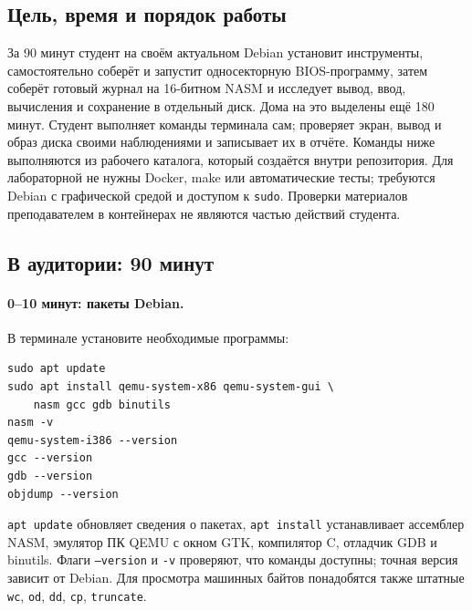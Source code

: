 \label{seminar04}
\begingroup
\setlength{\emergencystretch}{2em}
\subsection*{Цель, время и порядок работы}
За 90 минут студент на своём актуальном Debian установит инструменты,
самостоятельно соберёт и запустит односекторную BIOS-программу, затем
соберёт готовый журнал на 16-битном NASM и исследует вывод, ввод,
вычисления и сохранение в отдельный диск. Дома на это выделены ещё
180 минут. Студент выполняет команды терминала сам; проверяет экран,
вывод и образ диска своими наблюдениями и записывает их в отчёте.
Команды ниже выполняются из рабочего каталога, который создаётся
внутри репозитория. Для лабораторной не нужны Docker, make или
автоматические тесты; требуются Debian с графической средой и доступом
к \texttt{sudo}. Проверки материалов преподавателем в контейнерах
не являются частью действий студента.

\subsection*{В аудитории: 90 минут}
\paragraph{0--10 минут: пакеты Debian.}
В терминале установите необходимые программы:
\begin{lstlisting}[basicstyle=\ttfamily\small]
sudo apt update
sudo apt install qemu-system-x86 qemu-system-gui \
    nasm gcc gdb binutils
nasm -v
qemu-system-i386 --version
gcc --version
gdb --version
objdump --version
\end{lstlisting}
\texttt{apt update} обновляет сведения о пакетах, \texttt{apt install}
устанавливает ассемблер NASM, эмулятор ПК QEMU с окном GTK,
компилятор C, отладчик GDB и binutils. Флаги \texttt{--version} и
\texttt{-v} проверяют, что команды доступны; точная версия зависит
от Debian. Для просмотра машинных байтов понадобятся также штатные
\texttt{wc}, \texttt{od}, \texttt{dd}, \texttt{cp}, \texttt{truncate}.

